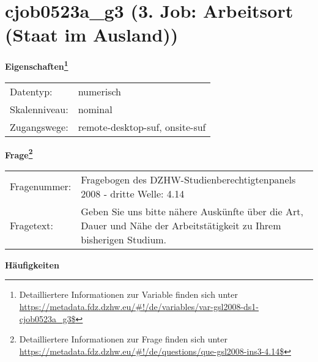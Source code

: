 
    \setcounter{footnote}{0}

    \vspace*{-1.8cm}
	\section{cjob0523a\_g3 (3. Job: Arbeitsort (Staat im Ausland))}
	\label{section:cjob0523a_g3}



    \vspace*{0.5cm}
    \noindent\textbf{Eigenschaften\footnote{Detailliertere Informationen zur Variable finden sich unter
		\url{https://metadata.fdz.dzhw.eu/\#!/de/variables/var-gsl2008-ds1-cjob0523a_g3$}}}\\
	\begin{tabularx}{\hsize}{@{}lX}
	Datentyp: & numerisch \\
	Skalenniveau: & nominal \\
	Zugangswege: &
	  remote-desktop-suf, 
	  onsite-suf
 \\
    \end{tabularx}



				\vspace*{0.5cm}
                \noindent\textbf{Frage\footnote{Detailliertere Informationen zur Frage finden sich unter
		              \url{https://metadata.fdz.dzhw.eu/\#!/de/questions/que-gsl2008-ins3-4.14$}}}\\
				\begin{tabularx}{\hsize}{@{}lX}
					Fragenummer: &
					  Fragebogen des DZHW-Studienberechtigtenpanels 2008 - dritte Welle:
					  4.14
 \\
					Fragetext: & Geben Sie uns bitte nähere Auskünfte über die Art, Dauer und Nähe der Arbeitstätigkeit zu Ihrem bisherigen Studium. \\
				\end{tabularx}





        		\vspace*{0.5cm}
                \noindent\textbf{Häufigkeiten}

